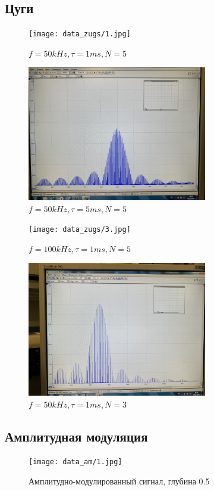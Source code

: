 \documentclass[a4paper, 12pt]{article}
\begin{document}
\subsection*{Цуги}
\begin{figure}[H]
    \centering
    \texttt{[image: data\_zugs/1.jpg]}
    \caption{$f = 50 kHz, \tau = 1 ms, N = 5$}
    \label{fig:data_zugs/1.jpg}
\end{figure}
\begin{figure}[H]
    \centering
    \includegraphics[width=0.7\textwidth]{data_zugs/2.jpg}
    \caption{$f = 50 kHz, \tau = 5 ms, N = 5$}
    \label{fig:data_zugs/2.jpg}
\end{figure}
\begin{figure}[H]
    \centering
    \texttt{[image: data\_zugs/3.jpg]}
    \caption{$f = 100 kHz, \tau = 1 ms, N = 5$}
    \label{fig:data_zugs/3.jpg}
\end{figure}
\begin{figure}[H]
    \centering
    \includegraphics[width=0.7\textwidth]{data_zugs/4.jpg}
    \caption{$f = 50 kHz, \tau = 1 ms, N = 3$}
    \label{fig:data_zugs/4.jpg}
\end{figure}
\subsection*{Амплитудная модуляция}
\begin{figure}[H]
    \centering
    \texttt{[image: data\_am/1.jpg]}
    \caption{Амплитудно-модулированный сигнал, глубина 0.5}
    \label{fig:data_am/1.jpg}
\end{figure}
\end{document}
